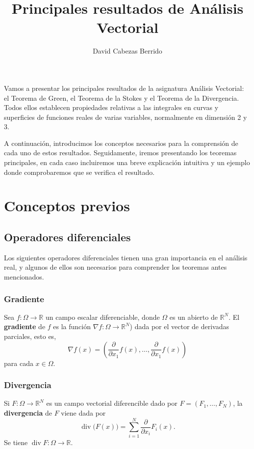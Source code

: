 \documentclass[12pt,spanish]{article}
\title{Principales resultados de Análisis Vectorial}
\author{David Cabezas Berrido}
\date{}
\theoremstyle{definition}
\theoremstyle{remark}
\begin{document}
\maketitle

Vamos a presentar los principales resultados de la asignatura Análisis Vectorial: el Teorema de Green, el Teorema de la Stokes y el Teorema de la Divergencia. Todos ellos establecen propiedades relativas a las integrales en curvas y superficies de funciones reales de varias variables, normalmente en dimensión 2 y 3.

A continuación, introducimos los conceptos necesarios para la comprensión de cada uno de estos resultados. Seguidamente, iremos presentando los teoremas principales, en cada caso incluiremos una breve explicación intuitiva y un ejemplo donde comprobaremos que se verifica el resultado.

\section{Conceptos previos}

\subsection{Operadores diferenciales}

Los siguientes operadores diferenciales tienen una gran importancia en el análisis real, y algunos de ellos son necesarios para comprender los teoremas antes mencionados.

\subsubsection*{Gradiente}

Sea $f:\Omega\rightarrow\mathbb{R}$ un campo escalar diferenciable, donde $\Omega$ es un abierto de $\mathbb{R}^N$. El \textbf{gradiente} de $f$ es la función $\nabla f: \Omega\rightarrow\mathbb{R}^N$) dada por el vector de derivadas parciales, esto es,
\[\nabla f(x)=\left(\frac{\partial}{\partial x_1}f(x),\ldots,\frac{\partial}{\partial x_1}f(x)\right)\]
para cada $x\in \Omega$.

\subsubsection*{Divergencia}

Si $F:\Omega\rightarrow\mathbb{R}^N$ es un campo vectorial diferencible dado por $F=(F_1,\ldots, F_N)$, la \textbf{divergencia} de $F$ viene dada por
\[\operatorname{div}\big(F(x)\big)=\sum_{i=1}^N\frac{\partial}{\partial x_i}F_i(x).\]
Se tiene $\operatorname{div} F:\Omega\rightarrow\mathbb{R}$.
\end{document}
